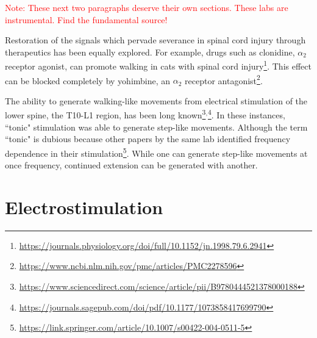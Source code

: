 \documentclass[12pt]{report}
\begin{document}
\textcolor{red}{Note: These next two paragraphs deserve their own sections. These labs are instrumental. Find the fundamental source!}

Restoration of the signals which pervade severance in spinal cord injury through therapeutics has been equally explored. For example, drugs such as clonidine, $\alpha_2$ receptor agonist, can promote walking in cats with spinal cord injury\footnote{\url{https://journals.physiology.org/doi/full/10.1152/jn.1998.79.6.2941}}. This effect can be blocked completely by yohimbine, an $\alpha_2$ receptor antagonist\footnote{\url{https://www.ncbi.nlm.nih.gov/pmc/articles/PMC2278596}}.\newline

The ability to generate walking-like movements from electrical stimulation of the lower spine, the T10-L1 region, has been long known\footnote{\url{https://www.sciencedirect.com/science/article/pii/B9780444521378000188}}$^,$\footnote{\url{https://journals.sagepub.com/doi/pdf/10.1177/1073858417699790}}. In these instances, ``tonic" stimulation was able to generate step-like movements. Although the term ``tonic" is dubious because other papers by the same lab identified frequency dependence in their stimulation\footnote{\url{https://link.springer.com/article/10.1007/s00422-004-0511-5}}. While one can generate step-like movements at once frequency, continued extension can be generated with another. 

\section{Electrostimulation}
\end{document}
